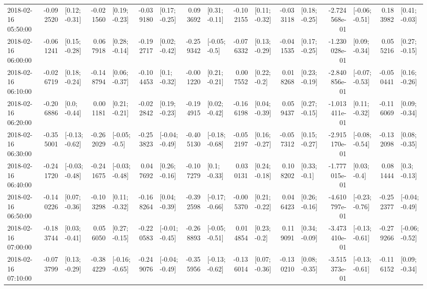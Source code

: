 \begin{tabular}{lrlrlrlrlrlrlrlrl}
2018-02-16 05:50:00 & -0.092520 &   [0.12; -0.31] & -0.021560 &   [0.19; -0.23] & -0.039180 &   [0.17; -0.25] &  0.093692 &   [0.31; -0.11] & -0.102155 &   [0.11; -0.32] & -0.033118 &   [0.18; -0.25] & -2.724568e-01 &  [-0.06; -0.51] &  0.183982 &   [0.41; -0.03] \\
2018-02-16 06:00:00 & -0.061241 &   [0.15; -0.28] &  0.067918 &   [0.28; -0.14] & -0.192717 &   [0.02; -0.42] & -0.259342 &   [-0.05; -0.5] & -0.076332 &   [0.13; -0.29] & -0.041535 &   [0.17; -0.25] & -1.230028e-01 &   [0.09; -0.34] &  0.055216 &   [0.27; -0.15] \\
2018-02-16 06:10:00 & -0.026719 &   [0.18; -0.24] & -0.148794 &   [0.06; -0.37] & -0.104453 &    [0.1; -0.32] & -0.001220 &   [0.21; -0.21] &  0.007552 &    [0.22; -0.2] &  0.018268 &   [0.23; -0.19] & -2.840856e-01 &  [-0.07; -0.53] & -0.050441 &   [0.16; -0.26] \\
2018-02-16 06:20:00 & -0.206886 &    [0.0; -0.44] &  0.001181 &   [0.21; -0.21] & -0.022842 &   [0.19; -0.23] & -0.194915 &   [0.02; -0.42] & -0.166198 &   [0.04; -0.39] &  0.059437 &   [0.27; -0.15] & -1.013411e-01 &   [0.11; -0.32] & -0.116069 &   [0.09; -0.34] \\
2018-02-16 06:30:00 & -0.355001 &  [-0.13; -0.62] & -0.262029 &   [-0.05; -0.5] & -0.253823 &  [-0.04; -0.49] & -0.405130 &  [-0.18; -0.68] & -0.052197 &   [0.16; -0.27] & -0.057312 &   [0.15; -0.27] & -2.915170e-01 &  [-0.08; -0.54] & -0.132098 &   [0.08; -0.35] \\
2018-02-16 06:40:00 & -0.241720 &  [-0.03; -0.48] & -0.241675 &  [-0.03; -0.48] &  0.047692 &   [0.26; -0.16] & -0.107279 &    [0.1; -0.33] &  0.030131 &   [0.24; -0.18] &  0.108202 &    [0.33; -0.1] & -1.777015e-01 &    [0.03; -0.4] &  0.081444 &    [0.3; -0.13] \\
2018-02-16 06:50:00 & -0.140226 &   [0.07; -0.36] & -0.103298 &   [0.11; -0.32] & -0.168264 &   [0.04; -0.39] & -0.392598 &  [-0.17; -0.66] & -0.005370 &   [0.21; -0.22] &  0.046423 &   [0.26; -0.16] & -4.610797e-01 &  [-0.23; -0.76] & -0.252377 &  [-0.04; -0.49] \\
2018-02-16 07:00:00 & -0.183744 &   [0.03; -0.41] &  0.056050 &   [0.27; -0.15] & -0.220583 &  [-0.01; -0.45] & -0.268893 &  [-0.05; -0.51] &  0.014854 &    [0.23; -0.2] &  0.119091 &   [0.34; -0.09] & -3.473410e-01 &  [-0.13; -0.61] & -0.279266 &  [-0.06; -0.52] \\
2018-02-16 07:10:00 & -0.073799 &   [0.13; -0.29] & -0.384229 &  [-0.16; -0.65] & -0.249076 &  [-0.04; -0.49] & -0.355956 &  [-0.13; -0.62] & -0.136014 &   [0.07; -0.36] & -0.130210 &   [0.08; -0.35] & -3.515373e-01 &  [-0.13; -0.61] & -0.116152 &   [0.09; -0.34] \\

\end{tabular}

